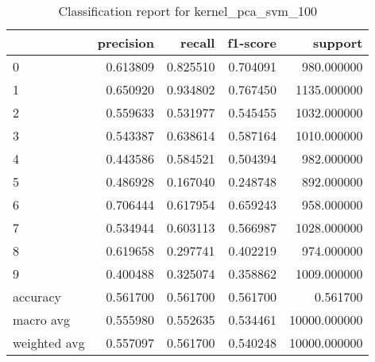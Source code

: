 \begin{table}[htb!]
\centering
\caption{Classification report for kernel_pca_svm_100}
\label{tab:classification-report-kernel_pca_svm_100}
\begin{tabular}{lrrrr}
\toprule
 & precision & recall & f1-score & support \\
\midrule
0 & 0.613809 & 0.825510 & 0.704091 & 980.000000 \\
1 & 0.650920 & 0.934802 & 0.767450 & 1135.000000 \\
2 & 0.559633 & 0.531977 & 0.545455 & 1032.000000 \\
3 & 0.543387 & 0.638614 & 0.587164 & 1010.000000 \\
4 & 0.443586 & 0.584521 & 0.504394 & 982.000000 \\
5 & 0.486928 & 0.167040 & 0.248748 & 892.000000 \\
6 & 0.706444 & 0.617954 & 0.659243 & 958.000000 \\
7 & 0.534944 & 0.603113 & 0.566987 & 1028.000000 \\
8 & 0.619658 & 0.297741 & 0.402219 & 974.000000 \\
9 & 0.400488 & 0.325074 & 0.358862 & 1009.000000 \\
accuracy & 0.561700 & 0.561700 & 0.561700 & 0.561700 \\
macro avg & 0.555980 & 0.552635 & 0.534461 & 10000.000000 \\
weighted avg & 0.557097 & 0.561700 & 0.540248 & 10000.000000 \\
\bottomrule
\end{tabular}
\end{table}
